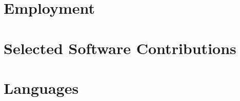 \section*{Employment}


\section*{Selected Software Contributions}


\section*{Languages}


%

\thispagestyle{lastpagestyle}


